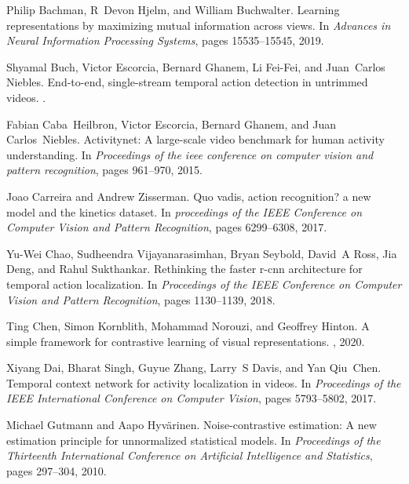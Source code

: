 \documentclass[final]{cvpr}
\begin{document}
\begin{table*}[t]
{\begin{thebibliography}{10}\itemsep=-1pt

Philip Bachman, R~Devon Hjelm, and William Buchwalter.
\newblock Learning representations by maximizing mutual information across
  views.
\newblock In {\em Advances in Neural Information Processing Systems}, pages
  15535--15545, 2019.

Shyamal Buch, Victor Escorcia, Bernard Ghanem, Li Fei-Fei, and Juan~Carlos
  Niebles.
\newblock End-to-end, single-stream temporal action detection in untrimmed
  videos.
.

Fabian Caba~Heilbron, Victor Escorcia, Bernard Ghanem, and Juan Carlos~Niebles.
\newblock Activitynet: A large-scale video benchmark for human activity
  understanding.
\newblock In {\em Proceedings of the ieee conference on computer vision and
  pattern recognition}, pages 961--970, 2015.

Joao Carreira and Andrew Zisserman.
\newblock Quo vadis, action recognition? a new model and the kinetics dataset.
\newblock In {\em proceedings of the IEEE Conference on Computer Vision and
  Pattern Recognition}, pages 6299--6308, 2017.

Yu-Wei Chao, Sudheendra Vijayanarasimhan, Bryan Seybold, David~A Ross, Jia
  Deng, and Rahul Sukthankar.
\newblock Rethinking the faster r-cnn architecture for temporal action
  localization.
\newblock In {\em Proceedings of the IEEE Conference on Computer Vision and
  Pattern Recognition}, pages 1130--1139, 2018.

Ting Chen, Simon Kornblith, Mohammad Norouzi, and Geoffrey Hinton.
\newblock A simple framework for contrastive learning of visual
  representations.
, 2020.

Xiyang Dai, Bharat Singh, Guyue Zhang, Larry~S Davis, and Yan Qiu~Chen.
\newblock Temporal context network for activity localization in videos.
\newblock In {\em Proceedings of the IEEE International Conference on Computer
  Vision}, pages 5793--5802, 2017.

Michael Gutmann and Aapo Hyv{\"a}rinen.
\newblock Noise-contrastive estimation: A new estimation principle for
  unnormalized statistical models.
\newblock In {\em Proceedings of the Thirteenth International Conference on
  Artificial Intelligence and Statistics}, pages 297--304, 2010.


\end{thebibliography}}
\end{table*}
\end{document}
